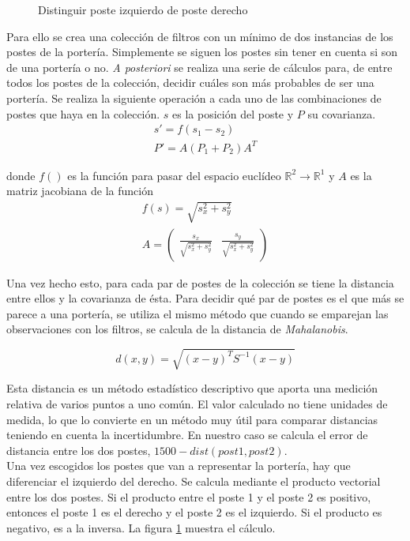 \begin{figure} [h]
  \centering
  \caption{Distinguir poste izquierdo de poste derecho}
  \label{fig:prod_vectorial}
\end{figure}

Para ello se crea una colección de filtros con un mínimo de dos instancias de los postes de la portería. Simplemente se siguen los postes sin tener en cuenta si son de una portería o no. \textit{A posteriori} se realiza una serie de cálculos para, de entre todos los postes de la colección, decidir cuáles son más probables de ser una portería. Se realiza la siguiente operación a cada uno de las combinaciones de postes que haya en la colección. $s$ es la posición del poste y $P$ su covarianza.
\begin{equation}
  \begin{split}
    s' = f(s_1 - s_2) \\
    P' = A (P_1 + P_2) A^T 
  \end{split}
\end{equation}

donde $f()$ es la función para pasar del espacio euclídeo $\mathbb{R}^2 \rightarrow \mathbb{R}^1$ y $A$ es la matriz jacobiana de la función
\begin{equation}
  \begin{split}
    f(s) = \sqrt{s_x^2 + s_y^2} \\
    A = \begin{pmatrix} \frac{s_x}{\sqrt{s_x^2 + s_y^2}} & \frac{s_y}{\sqrt{s_x^2 + s_y^2}} \end{pmatrix}    
  \end{split}
\end{equation}

Una vez hecho esto, para cada par de postes de la colección se tiene la distancia entre ellos y la covarianza de ésta. Para decidir qué par de postes es el que más se parece a una portería, se utiliza el mismo método que cuando se emparejan las observaciones con los filtros, se calcula de la distancia de \textit{Mahalanobis}. 

\begin{equation}
  d(x,y) = \sqrt{(x-y)^T S^{-1} (x-y)}
\end{equation}

Esta distancia es un método estadístico descriptivo que aporta una medición relativa de varios puntos a uno común. El valor calculado no tiene unidades de medida, lo que lo convierte en un método muy útil para comparar distancias teniendo en cuenta la incertidumbre. En nuestro caso se calcula el error de distancia entre los dos postes, $1500 - dist(post1,post2)$. \\

Una vez escogidos los postes que van a representar la portería, hay que diferenciar el izquierdo del derecho. Se calcula mediante el producto vectorial entre los dos postes. Si el producto entre el poste 1 y el poste 2 es positivo, entonces el poste 1 es el derecho y el poste 2 es el izquierdo. Si el producto es negativo, es a la inversa. La figura \ref{fig:prod_vectorial} muestra el cálculo.
